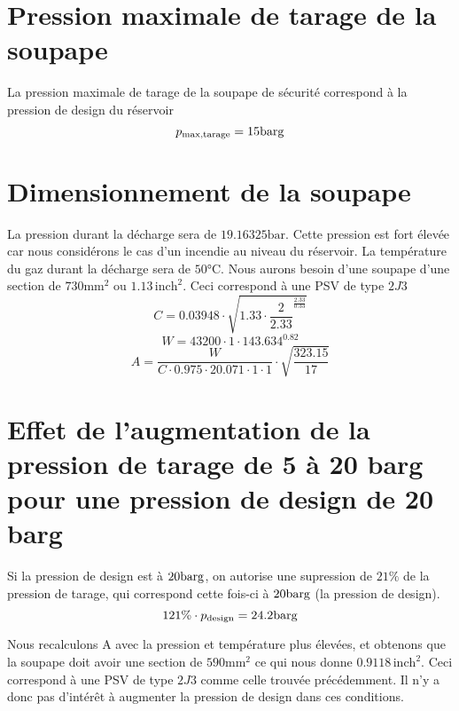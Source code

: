 \section{Pression maximale de tarage de la soupape} 
La pression maximale de tarage de la soupape de sécurité
correspond à la pression de design du réservoir
\[ p_{\text{max,tarage}} = 15\si{\bar}\text{g} \]

\section{Dimensionnement de la soupape} 
La pression durant la décharge sera de $19.16325 \si{\bar}$. 
Cette pression est fort élevée car nous considérons le cas d'un incendie au niveau du réservoir. 
La température du gaz durant la décharge sera de $50\si{\celsius}$. 
Nous aurons besoin d'une soupape d'une section de $730\si{\milli\meter\squared}$ 
ou $1.13 \, \text{inch}^2$. Ceci correspond à une PSV de type $2J3$
\[ C = 0.03948 \cdot \sqrt{1.33 \cdot \frac{2}{2.33}^{\frac{2.33}{0.33}}} \]
\[ W = 43200 \cdot 1 \cdot 143.634^{0.82} \]
\[ A = \frac{W}{C \cdot 0.975 \cdot 20.071 \cdot 1 \cdot 1} \cdot \sqrt{\frac{323.15}{17}} \]

\section{Effet de l'augmentation de la pression de tarage de 5 à 20 barg pour une pression de design de 20 barg} 
Si la pression de design est à $20\si{\bar}\text{g}$, 
on autorise une supression de $21\%$ de la pression de tarage,
qui correspond cette fois-ci à $20\si{\bar}\text{g}$ (la pression de design).
\[ 121\% \cdot p_{\text{design}} = 24.2\si{\bar}\text{g} \]

Nous recalculons A avec la pression et température plus élevées,
et obtenons que la soupape doit avoir une section de $590\si{\milli\meter\squared}$
ce qui nous donne $0.9118 \, \text{inch}^2$. Ceci correspond à une PSV de type $2J3$ comme celle trouvée précédemment. Il n'y a donc pas d'intérêt
à augmenter la pression de design dans ces conditions.

